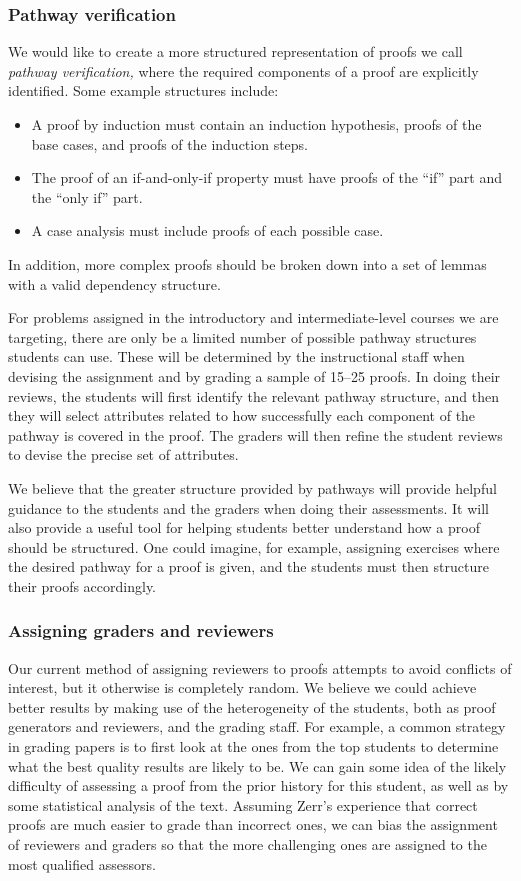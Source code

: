 \documentclass[12pt]{article}
\begin{document}
\subsubsection*{Pathway verification}

We would like to
create a more structured representation of proofs we call {\em pathway
  verification,}  where the required components of a proof are
explicitly identified.  Some example structures include:
\begin{itemize}
\item A proof by induction must contain an induction hypothesis,
  proofs of the base cases, and proofs of the induction steps.
\item The proof of an if-and-only-if property must have proofs of the
  ``if'' part and the ``only if'' part.
\item A case analysis must include proofs of each possible case.
\end{itemize}
In addition, more complex proofs should be broken down into a set of
lemmas with a valid dependency structure.

For problems assigned in the introductory and intermediate-level
courses we are targeting, there are only be a limited number of
possible pathway structures students can use.  These will be
determined by the instructional staff when devising the assignment and
by grading a sample of 15--25 proofs.  In doing their reviews, the
students will first identify the relevant pathway structure, and then
they will select attributes related to how successfully each component
of the pathway is covered in the proof.  The graders will then refine
the student reviews to devise the precise set of attributes.

We believe that the greater structure provided by pathways will
provide helpful guidance to the students and the graders when doing
their assessments.  It will also provide a useful tool for helping
students better understand how a proof should be structured.  One
could imagine, for example, assigning exercises where the
desired pathway for a proof is given, and the students must
then structure their proofs accordingly.

\subsubsection*{Assigning graders and reviewers}

Our current method of assigning reviewers to proofs attempts to avoid
conflicts of interest, but it otherwise is completely random.  We
believe we could achieve better results by making use of the
heterogeneity of the students, both as proof generators and reviewers,
and the grading staff.  For example, a common strategy in grading
papers is to first look at the ones from the top students to determine
what the best quality results are likely to be.  We can gain some idea
of the likely difficulty of assessing a proof from the prior history
for this student, as well as by some statistical analysis of the
text.  Assuming Zerr's experience that correct proofs are much easier
to grade than incorrect ones, we can bias the assignment of reviewers
and graders so that the more challenging ones are assigned to the
most qualified assessors.
\end{document}
